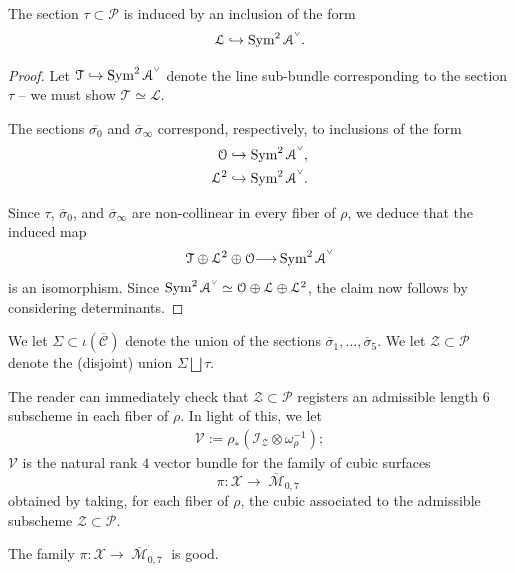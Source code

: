\documentclass[12pt,reqno]{amsart}
\DeclareMathOperator{\M}{\mathcal{M}}
\renewcommand{\to}{{\longrightarrow}}
\numberwithin{equation}{section}
\renewcommand{\O}{\mathcal O}
\newcommand{\V}{\mathcal V}
\newcommand{\cP}{\mathcal P}
\newcommand{\cX}{\mathcal{X}}
\newcommand{\smvee}{\raise0.5ex\hbox{$\scriptscriptstyle\vee$}}
\renewcommand {\o}[1]{\overline{#1}}
\begin{document}
\begin{lemma}
  \label{lemma:tau}
  The section $\tau \subset \cP$ is induced by an inclusion of the
  form
  $${\mathcal{L}} \hookrightarrow \Sym^{2} \mathcal{A}^{\smvee}.$$
\end{lemma}

\begin{proof}
  Let $\mathcal{T} \hookrightarrow \Sym^{2} \mathcal{A}^{\smvee}$
  denote the line sub-bundle corresponding to the section $\tau$ -- we
  must show $\mathcal{T} \simeq \mathcal{L}$.

  The sections
  $\o{\sigma_{0}}$ and $\o{\sigma}_{\infty}$ correspond, respectively,
  to inclusions of the form
  \begin{align*}
    \O \hookrightarrow \Sym^{2} \mathcal{A}^{\smvee}, \\
    \mathcal{L}^{2} \hookrightarrow \Sym^{2} \mathcal{A}^{\smvee}. \\
  \end{align*}

  Since $\tau$, $\o{\sigma}_{0}$, and $\o{\sigma}_{\infty}$ are
  non-collinear in every fiber of $\rho$, we deduce that the induced
  map
  $$\mathcal{T} \oplus \mathcal{L}^{2} \oplus \O \to \Sym^{2}
  \mathcal{A}^{\smvee}$$ is an isomorphism.  Since
  $\Sym^{2} \mathcal{A}^{\smvee} \simeq \O \oplus \mathcal{L} \oplus
  \mathcal{L}^{2}$, the claim now follows by considering determinants.
\end{proof}


\begin{definition}
  \label{def:ZB2} We let $\Sigma \subset \iota(\o{\mathcal{C}})$
  denote the union of the sections
  $\o{\sigma}_{1}, \dots, \o{\sigma}_{5}$.  We let
  $\mathcal{Z} \subset \cP$ denote the (disjoint) union
  $\Sigma \bigsqcup \tau$.
\end{definition}

The reader can immediately check that $\mathcal{Z} \subset \cP$
registers an admissible length $6$ subscheme in each fiber of
$\rho$. In light of this, we let
\begin{align}
  \label{eq:VB2}
  \mathcal{V} := \rho_{*}(\mathcal{I}_{\mathcal{Z}} \otimes \omega_{\rho}^{-1});
\end{align}
$\V$ is the natural rank $4$ vector bundle for the family of cubic
surfaces $$\pi: \cX \to \o{\M}_{0,7}$$ obtained by taking, for each
fiber of $\rho$, the cubic associated to the admissible subscheme
$\mathcal{Z} \subset \cP$.

\begin{proposition}
  \label{prop:goodnessB2} The family $\pi: \cX \to \o{\M}_{0,7}$ is
  good.
\end{proposition}
\end{document}
